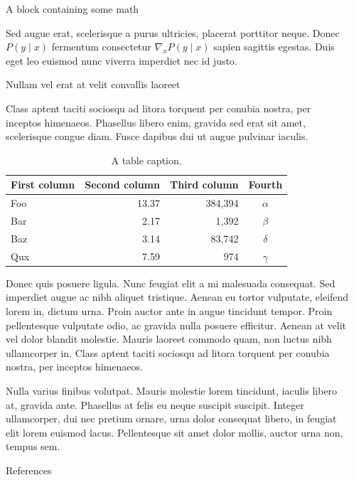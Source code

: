 \documentclass[final]{beamer}
\newlength{\sepwidth}
\newlength{\colwidth}
\newcommand{\separatorcolumn}{\begin{column}{\sepwidth}\end{column}}
\begin{document}
\begin{frame}[t]
\begin{columns}[t]
\begin{column}{\colwidth}
\begin{block}{A block containing some math}

    Sed augue erat, scelerisque a purus ultricies, placerat porttitor neque.
    Donec $P(y \mid x)$ fermentum consectetur $\nabla_x P(y \mid x)$ sapien
    sagittis egestas. Duis eget leo euismod nunc viverra imperdiet nec id
    justo.

  \end{block}

  \begin{block}{Nullam vel erat at velit convallis laoreet}

    Class aptent taciti sociosqu ad litora torquent per conubia nostra, per
    inceptos himenaeos. Phasellus libero enim, gravida sed erat sit amet,
    scelerisque congue diam. Fusce dapibus dui ut augue pulvinar iaculis.

    \begin{table}
      \centering
      \begin{tabular}{l r r c}
        \toprule
        \textbf{First column} & \textbf{Second column} & \textbf{Third column} & \textbf{Fourth} \\
        \midrule
        Foo & 13.37 & 384,394 & $\alpha$ \\
        Bar & 2.17 & 1,392 & $\beta$ \\
        Baz & 3.14 & 83,742 & $\delta$ \\
        Qux & 7.59 & 974 & $\gamma$ \\
        \bottomrule
      \end{tabular}
      \caption{A table caption.}
    \end{table}

    Donec quis posuere ligula. Nunc feugiat elit a mi malesuada consequat. Sed
    imperdiet augue ac nibh aliquet tristique. Aenean eu tortor vulputate,
    eleifend lorem in, dictum urna. Proin auctor ante in augue tincidunt
    tempor. Proin pellentesque vulputate odio, ac gravida nulla posuere
    efficitur. Aenean at velit vel dolor blandit molestie. Mauris laoreet
    commodo quam, non luctus nibh ullamcorper in. Class aptent taciti sociosqu
    ad litora torquent per conubia nostra, per inceptos himenaeos.

    Nulla varius finibus volutpat. Mauris molestie lorem tincidunt, iaculis
    libero at, gravida ante. Phasellus at felis eu neque suscipit suscipit.
    Integer ullamcorper, dui nec pretium ornare, urna dolor consequat libero,
    in feugiat elit lorem euismod lacus. Pellentesque sit amet dolor mollis,
    auctor urna non, tempus sem.

  \end{block}

  \begin{block}{References}


  \end{block}

\end{column}

\separatorcolumn
\end{columns}
\end{frame}
\end{document}

